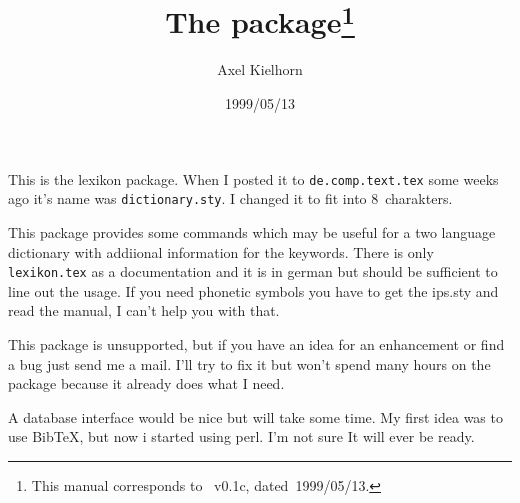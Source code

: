 \documentclass[fontsize=13pt, DIV=8, pagesize=auto]{scrartcl}
\title{The \pkg{lexikon} package\thanks{This manual corresponds to \pkg{lexikon}~v0.1c, dated~1999/05/13.}}
\author{Axel Kielhorn\\\mail{A.Kielhorn@tu-bs.de}}
\date{1999/05/13}
\makeatletter
\newcommand*{\pkg}[1]{\textsf{#1}}
\newcommand*{\BibTeX}{Bib\kern-0.08em\TeX\@\xspace}
\def\BibTeX{BibTeX\xspace}%
\makeatother
\begin{document}
\maketitle

\noindent
This is the \pkg{lexikon} package.
When I posted it to \texttt{de.comp.text.tex} some weeks ago it's name was 
\texttt{dictionary.sty}. I changed it to fit into 8~charakters.

This package provides some commands which may be useful for a two language 
dictionary with addiional information for the keywords. There is only 
\texttt{lexikon.tex} as a documentation and it is in german but should be sufficient 
to line out the usage. If you need phonetic symbols you have to get the 
\pkg{ips.sty} and read the manual, I can't help you with that.

This package is unsupported, but if you have an idea for an enhancement or 
find a bug just send me a mail. I'll try to fix it but won't spend many 
hours on the package because it already does what I need.

A database interface would be nice but will take some time.
My first idea was to use \BibTeX, but now i started using perl. I'm not sure 
It will ever be ready.
\end{document}
